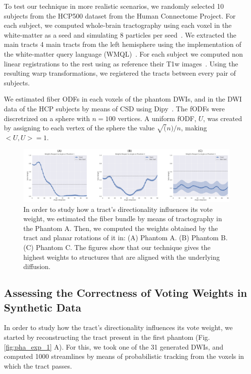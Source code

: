 To test our technique in more realistic scenarios, we randomly selected 10 subjects
from the HCP500 dataset from the Human Connectome Project. For each subject,
we computed whole-brain tractography using each voxel in the white-matter as
a seed and simulating 8 particles per seed~\cite{Garyfallidis2014}. We extracted
the main tracts 4 main tracts from the left hemisphere using
the implementation of the white-matter query language (WMQL)~\cite{Wassermann2016}.
For each subject we computed non linear registrations to the rest using as
reference their T1w images~\cite{Jenkinson2012}. Using the resulting warp
transformations, we registered the tracts between every pair of subjects.

We estimated fiber ODFs in each voxels of the phantom DWIs, and in the DWI data
of the HCP subjects by means of CSD using Dipy~\cite{Garyfallidis2014}. The fODFs were
discretrized on a sphere with $n=100$ vertices. A uniform fODF, $U$, was created
by assigning to each vertex of the sphere the value $\sqrt(n)/n$, making $<U, U> = 1$.

\begin{figure}[t]
    \includegraphics[width=\textwidth]{7.multiatlas/img/weights.png}
    \caption{In order to study how a tract's directionality influences its vote weight,
             we estimated the fiber bundle by means of tractography in the Phantom A.
             Then, we computed the weights obtained by the tract and planar rotations of
             it in: (A) Phantom A. (B) Phantom B. (C) Phantom C. The figures show that
             our technique gives the highest weights to structures that are aligned
             with the underlying diffusion.}
    \label{fig:weights}
\end{figure} 

\subsection{Assessing the Correctness of Voting Weights in Synthetic Data}
In order to study how the tract's directionality influences its vote weight,
we started by reconstructing the tract present in the first phantom (Fig. \ref{fig:pha_exp_1} A).
For this, we took one of the 31 generated DWIs, and computed 1000 streamlines by
means of probabilistic tracking from the voxels in which the tract passes.

